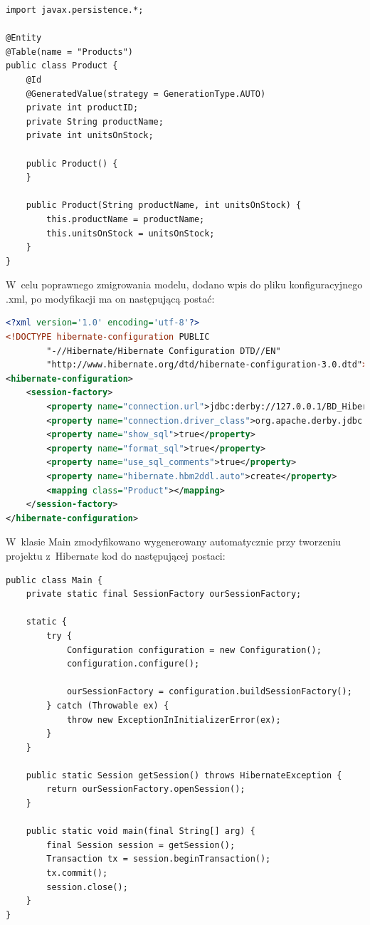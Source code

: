\documentclass[12pt, a4paper]{mwart}
\begin{document}
\begin{lstlisting}
import javax.persistence.*;

@Entity
@Table(name = "Products")
public class Product {
    @Id
    @GeneratedValue(strategy = GenerationType.AUTO)
    private int productID;
    private String productName;
    private int unitsOnStock;

    public Product() {
    }

    public Product(String productName, int unitsOnStock) {
        this.productName = productName;
        this.unitsOnStock = unitsOnStock;
    }
}
\end{lstlisting}

W~celu poprawnego zmigrowania modelu, dodano wpis do pliku konfiguracyjnego .xml, po modyfikacji ma on następującą postać:
\begin{lstlisting}[language=XML]
<?xml version='1.0' encoding='utf-8'?>
<!DOCTYPE hibernate-configuration PUBLIC
        "-//Hibernate/Hibernate Configuration DTD//EN"
        "http://www.hibernate.org/dtd/hibernate-configuration-3.0.dtd">
<hibernate-configuration>
    <session-factory>
        <property name="connection.url">jdbc:derby://127.0.0.1/BD_Hibernate</property>
        <property name="connection.driver_class">org.apache.derby.jdbc.ClientDriver</property>
        <property name="show_sql">true</property>
        <property name="format_sql">true</property>
        <property name="use_sql_comments">true</property>
        <property name="hibernate.hbm2ddl.auto">create</property>
        <mapping class="Product"></mapping>
    </session-factory>
</hibernate-configuration>
\end{lstlisting}

W~klasie Main zmodyfikowano wygenerowany automatycznie przy tworzeniu projektu z~Hibernate kod do następującej postaci:
\begin{lstlisting}
public class Main {
    private static final SessionFactory ourSessionFactory;

    static {
        try {
            Configuration configuration = new Configuration();
            configuration.configure();

            ourSessionFactory = configuration.buildSessionFactory();
        } catch (Throwable ex) {
            throw new ExceptionInInitializerError(ex);
        }
    }

    public static Session getSession() throws HibernateException {
        return ourSessionFactory.openSession();
    }

    public static void main(final String[] arg) {
        final Session session = getSession();
        Transaction tx = session.beginTransaction();
        tx.commit();
        session.close();
    }
}
\end{lstlisting}
\end{document}
